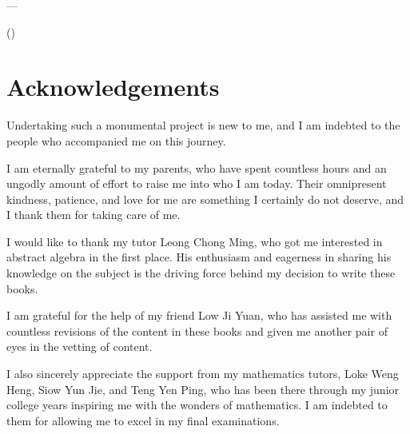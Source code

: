 \vspace*{2\baselineskip}
\cleardoublepage

\thispagestyle{empty}
\vspace*{2cm}

\begin{center}
    \Large{\parbox{10cm}{
        \begin{raggedright}
            \Large
            \quotepagetext
            \vspace{0.3cm}
            
            \hfill
            --- \quotepageattribution\\
            \vspace{-0.25cm}
            
            \hfill
            \normalsize
            (\quotepagecitation)
        \end{raggedright}
    }
}
\end{center}

\newpage

\createtoc
\setcounter{part}{\volumenumber}

\chapter{Acknowledgements}
Undertaking such a monumental project is new to me, and I am indebted to the people who accompanied me on this journey.

I am eternally grateful to my parents, who have spent countless hours and an ungodly amount of effort to raise me into who I am today. Their omnipresent kindness, patience, and love for me are something I certainly do not deserve, and I thank them for taking care of me.

I would like to thank my tutor Leong Chong Ming, who got me interested in abstract algebra in the first place. His enthusiasm and eagerness in sharing his knowledge on the subject is the driving force behind my decision to write these books.

I am grateful for the help of my friend Low Ji Yuan, who has assisted me with countless revisions of the content in these books and given me another pair of eyes in the vetting of content.

I also sincerely appreciate the support from my mathematics tutors, Loke Weng Heng, Siow Yun Jie, and Teng Yen Ping, who has been there through my junior college years inspiring me with the wonders of mathematics. I am indebted to them for allowing me to excel in my final examinations.

